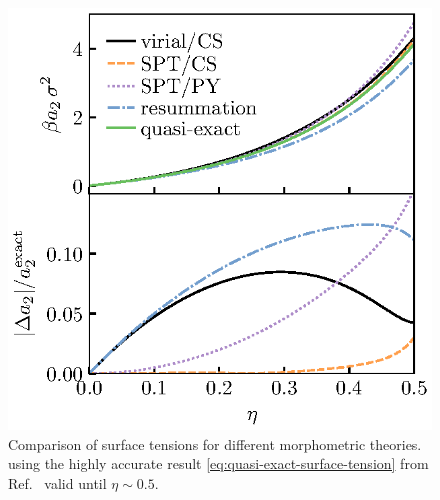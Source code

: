\documentclass[11pt,twoside]{report}
\begin{document}
\begin{figure}
  \includegraphics[width=0.9\linewidth,outer]{resummation-a2}
  \caption[Accuracy of surface tension from partially resumming the virial series]{
    Comparison of surface tensions for different morphometric theories.
  using the highly accurate result \eqref{eq:quasi-exact-surface-tension} from Ref.\ \cite{DavidchackMP2015} valid until $\eta \sim 0.5$.}
  \label{fig:resummation-a2}
\end{figure}



\end{document}
